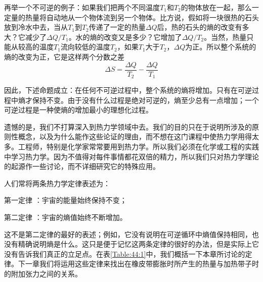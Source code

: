 再举一个不可逆的例子：如果我们把两个不同温度$T_1$和$T_2$的物体放在一起，那么一定量的热量将自动地从一个物体流到另一个物体。比方说，假如将一块很热的石头放到冷水中去，当从$T_1$到$T_2$传递了一定的热量$\Delta Q$后，热的石头的熵的改变有多大？它减少了$\Delta Q /T_1$。水的熵的改变又是多少？它增加了$\Delta Q /T_2$。当然，热量只能从较高的温度$T_1$流向较低的温度$T_2$，如果$T_1$大于$T_2$，$\Delta Q$为正。所以整个系统的熵的改变为正，它是这样两个分数之差
\begin{equation}
    \label{Eq:I:44:19}
    \Delta S = \frac{\Delta Q}{T_2} - \frac{\Delta Q}{T_1}
\end{equation}

因此，下述命题成立：在任何不可逆过程中，整个系统的熵将增加。只有在可逆过程中熵才保持不变。由于没有什么过程是绝对可逆的，熵至少总有一点增加；一个可逆过程是一种使熵的增加最小的理想化过程。

遗憾的是，我们不打算深入到热力学领域中去。我们的目的只在于说明所涉及的原则性概念，以及为什么能作这些论证的理由，而不想在这门课程中使热力学用得太多。工程师，特别是化学家常常要用到热力学。所以我们必须在化学或工程的实践中学习热力学。因为不值得对每件事情都花双倍的精力，所以我们只对热力学理论的起源作一些讨论，而不详细研究它的特殊应用。

人们常将两条热力学定律表述为：

第一定律 ：宇宙的能量始终保持不变；

第二定律 ：宇宙的熵值始终不断增加。

这不是第二定律的最好的表述；例如，它没有说明在可逆循环中熵值保持相同，也没有精确说明熵是什么。这只是便于记忆这两条定律的很好的办法，但是实际上它没有告诉我们真正的立足点。在表\ref{Table:44:1}中，我们概括一下本章所讨论的定律。下一章我们将运用这些定律来找出在橡皮带膨胀时所产生的热量与加热带子时的附加张力之间的关系。

